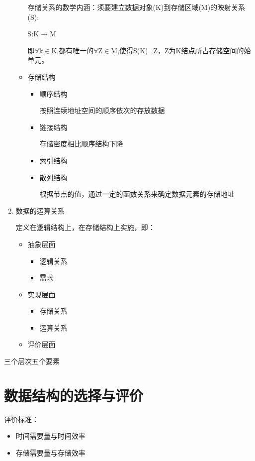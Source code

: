 \documentclass[AutoFakeBold]{LZUThesis2007}
\begin{document}
\begin{enumerate}
\begin{itemize}
							存储关系的数学内涵：须要建立数据对象(K)到存储区域(M)的映射关系(S):

							S:K$\rightarrow$M

							即$\forall \mathrm{k} \in \mathrm{K}$,都有唯一的$\forall \mathrm{Z} \in \mathrm{M}$,使得S(K)=Z，Z为K结点所占存储空间的始单元。

	
				\item  存储结构
					\begin{itemize}
						\item  顺序结构
			
									按照连续地址空间的顺序依次的存放数据
			
						\item  链接结构

									存储密度相比顺序结构下降

						\item  索引结构
						\item  散列结构

									根据节点的值，通过一定的函数关系来确定数据元素的存储地址

					\end{itemize}
			\end{itemize}
	\item 数据的运算关系
	
				定义在逻辑结构上，在存储结构上实施，即：
				\begin{itemize}
					\item  抽象层面
						\begin{itemize}
							\item 逻辑关系
							\item 需求
						\end{itemize}
					\item  实现层面
						\begin{itemize}
							\item 存储关系
							\item 运算关系
						\end{itemize}
					\item  评价层面
				\end{itemize}
\end{enumerate}

三个层次五个要素

	\section{数据结构的选择与评价}
		评价标准：
			\begin{itemize}
				\item 时间需要量与时间效率
				\item 存储需要量与存储效率
			\end{itemize}
\end{document}
